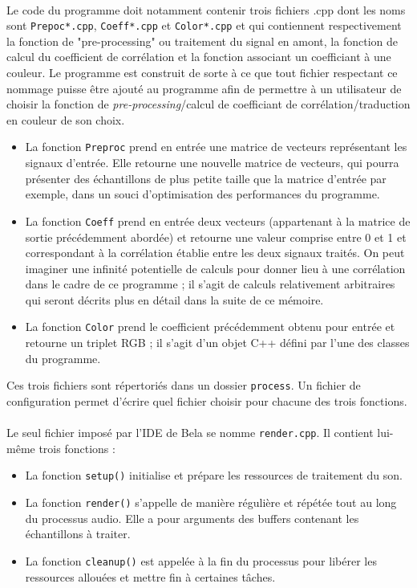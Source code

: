 \paragraph{}
Le code du programme doit notamment contenir trois fichiers .cpp dont
les noms sont \verb!Prepoc*.cpp!, \verb!Coeff*.cpp! et
\verb!Color*.cpp! et qui contiennent respectivement la fonction de
"pre-processing" ou traitement du signal en amont, la fonction de
calcul du coefficient de corrélation et la fonction associant un
coefficiant à une couleur. Le programme est construit de sorte à ce
que tout fichier respectant ce nommage puisse être ajouté au programme
afin de permettre à un utilisateur de choisir la fonction de
\textit{pre-processing}/calcul de coefficiant de
corrélation/traduction en couleur de son choix.
\begin{itemize}
 \item La fonction \verb!Preproc! prend en entrée une matrice de
       vecteurs représentant les signaux d'entrée. Elle retourne une
       nouvelle matrice de vecteurs, qui pourra présenter des
       échantillons de plus petite taille que la matrice d'entrée par
       exemple, dans un souci d'optimisation des performances du
       programme.
 \item La fonction \verb!Coeff! prend en entrée deux vecteurs
       (appartenant à la matrice de sortie précédemment abordée) et
       retourne une valeur comprise entre 0 et 1 et correspondant à la
       corrélation établie entre les deux signaux traités. On peut
       imaginer une infinité potentielle de calculs pour donner lieu à
       une corrélation dans le cadre de ce programme ; il s'agit de
       calculs relativement arbitraires qui seront décrits plus en détail
       dans la suite de ce mémoire.
 \item La fonction \verb!Color! prend le coefficient précédemment obtenu
       pour entrée et retourne un triplet RGB ; il s'agit d'un objet C++
       défini par l'une des classes du programme.
\end{itemize}
Ces trois fichiers sont répertoriés dans un dossier \verb!process!. Un
fichier de configuration permet d'écrire quel fichier choisir pour
chacune des trois fonctions.

\paragraph{}
Le seul fichier imposé par l'IDE de Bela se nomme \verb!render.cpp!. Il
contient lui-même trois fonctions :
\begin{itemize}
 \item La fonction \verb!setup()! initialise et prépare les ressources de
       traitement du son.
 \item La fonction \verb!render()! s'appelle de manière régulière et répétée
       tout au long du processus audio. Elle a pour arguments des buffers
       contenant les échantillons à traiter.
 \item La fonction \verb!cleanup()! est appelée à la fin du processus pour
       libérer les ressources allouées et mettre fin à certaines tâches.
\end{itemize}

